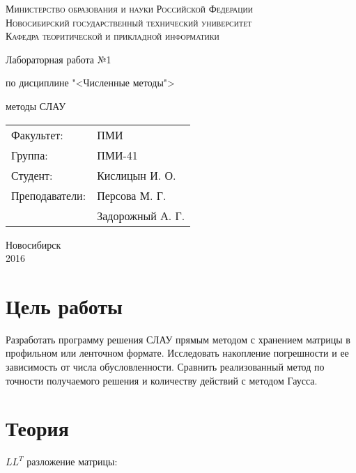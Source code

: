 \documentclass[oneside, final, 12pt]{extarticle}
\begin{document}
\begin{titlepage}
	\begin{centering}
		\textsc{Министерство образования и науки Российской Федерации}\\
		\textsc{Новосибирский государственный технический университет}\\
		\textsc{Кафедра теоритической и прикладной информатики}\\
	\end{centering}
	\vfill
	\vfill
	\vfill
	\Large
	\centerline{Лабораторная работа №1}
	\centerline{по дисциплине "<Численные методы">}
	\centerline{ методы СЛАУ}
	\normalsize
	\vfill
	\vfill
	\vfill
	\begin{flushleft}
		\begin{minipage}{0.3\textwidth}
			\begin{tabular}{l l}
				Факультет: & ПМИ\\
				Группа: & ПМИ-41\\
				Студент: & Кислицын И. О.\\
				Преподаватели: & Персова М. Г.\\
				~ & Задорожный А. Г. 
			\end{tabular}
		\end{minipage}
	\end{flushleft}
	\vfill
	\vfill
	\begin{centering}
		Новосибирск\\
		2016\\
	\end{centering}
\end{titlepage}
\setcounter{page}{2}
\lstset{
	breaklines=\true,
	basicstyle=\footnotesize\ttfamily,
	tabsize=2,
	showspaces=\false,
	breaklines=\true,
	breakatwhitespace=\true,
	extendedchars=\true,
	keepspaces=\true,
	language=Haskell
}
\section{Цель работы}
Разработать программу решения СЛАУ прямым методом с хранением матрицы в профильном или ленточном формате. Исследовать накопление погрешности и ее зависимость от числа обусловленности. Сравнить реализованный метод по точности получаемого решения и количеству действий с методом Гаусса.

\section{Теория}
\(LL^T\) разложение матрицы:
\end{document}
